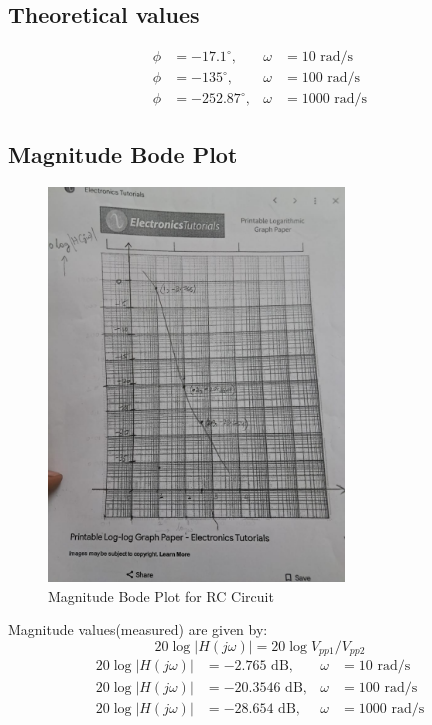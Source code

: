 \documentclass[a4paper,12pt]{article}
\begin{document}
\subsection{Theoretical values}
\begin{align}
\phi &= -17.1^\circ , & \omega &= 10 \text{ rad/s} \\
\phi &= -135^\circ , & \omega &= 100 \text{ rad/s} \\
\phi &= -252.87^\circ , & \omega &= 1000 \text{ rad/s}
\end{align}
\subsection{Magnitude Bode Plot}
\begin{figure}[H]
    \centering
    \includegraphics[width=0.7\textwidth]{fig/mbd3.jpeg} %
    \caption{Magnitude Bode Plot for RC Circuit}
\end{figure}
Magnitude values(measured) are given by:
$$20\log{|H(j\omega)|}=20\log{V_{pp1}/V_{pp2}}$$
\begin{align}
20\log|H(j\omega)| &= -2.765 \text{ dB}, & \omega &= 10 \text{ rad/s} \\
20\log|H(j\omega)| &= -20.3546 \text{ dB}, & \omega &= 100 \text{ rad/s} \\
20\log|H(j\omega)| &= -28.654 \text{ dB}, & \omega &= 1000 \text{ rad/s}
\end{align}
\end{document}
